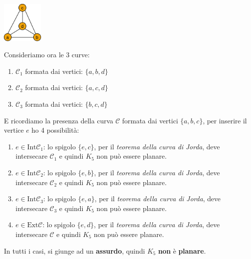 \begin{flushleft}
\begin{boxA}
        \begin{center}
            \includegraphics[width=0.15\textwidth]{img/k5_2}
        \end{center}
        Consideriamo ora le 3 curve: 
        \begin{enumerate}[nosep]
            \item $\mathcal{C}_1$ formata dai vertici: $\{a, b, d\}$
            \item $\mathcal{C}_2$ formata dai vertici: $\{a, c, d\}$
            \item $\mathcal{C}_3$ formata dai vertici: $\{b, c, d\}$
        \end{enumerate}
        E ricordiamo la presenza della curva $\mathcal{C}$ formata dai vertici $\{a, b, c\}$, per inserire il vertice $e$ ho 4 possibilità:
        \begin{enumerate}[nosep]
            \item $e \in \text{Int}\mathcal{C}_1$: lo spigolo $\{e, c\}$, per il \textit{teorema della curva di Jorda}, deve intersecare $\mathcal{C}_1$ e quindi $K_5$ non può essere planare.
            \item $e \in \text{Int}\mathcal{C}_2$: lo spigolo $\{e, b\}$, per il \textit{teorema della curva di Jorda}, deve intersecare $\mathcal{C}_2$ e quindi $K_5$ non può essere planare.
            \item $e \in \text{Int}\mathcal{C}_3$: lo spigolo $\{e, a\}$, per il \textit{teorema della curva di Jorda}, deve intersecare $\mathcal{C}_3$ e quindi $K_5$ non può essere planare.
            \item $e \in \text{Ext}\mathcal{C}$: lo spigolo $\{e, d\}$, per il \textit{teorema della curva di Jorda}, deve intersecare $\mathcal{C}$ e quindi $K_5$ non può essere planare.
        \end{enumerate}
        In tutti i casi, si giunge ad un \textbf{assurdo}, quindi $K_5$ \textbf{non} è \textbf{planare}.
    \end{boxA}
\end{flushleft}

